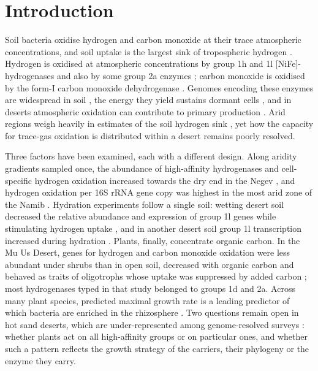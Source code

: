 \documentclass[11pt]{article}
\begin{document}
\section*{Introduction}
Soil bacteria oxidise hydrogen and carbon monoxide at their trace atmospheric concentrations, and
soil uptake is the largest sink of tropospheric hydrogen \citep{ehhalt2009h2cycle}. Hydrogen is
oxidised at atmospheric concentrations by group 1h and 1l [NiFe]-hydrogenases
\citep{greening2016genomic,ortiz2021antarctic} and also by some group 2a enzymes
\citep{islam2020group2a,grinter2023structural}; carbon monoxide is oxidised by the form-I carbon
monoxide dehydrogenase \citep{king2007coox,cordero2019atmospheric}. Genomes encoding these enzymes are
widespread in soil \citep{bay2021trace}, the energy they yield sustains dormant cells
\citep{greening2015persistence,cordero2019atmospheric}, and in deserts atmospheric oxidation can
contribute to primary production \citep{ji2017atmospheric,ray2022atmospheric}. Arid regions weigh
heavily in estimates of the soil hydrogen sink \citep{reji2025h2sink}, yet how the capacity for
trace-gas oxidation is distributed within a desert remains poorly resolved.

Three factors have been examined, each with a different design. Along aridity gradients sampled once,
the abundance of high-affinity hydrogenases and cell-specific hydrogen oxidation increased towards the
dry end in the Negev \citep{bay2021aridity}, and hydrogen oxidation per 16S rRNA gene copy was highest in
the most arid zone of the Namib \citep{tribbia2026namib}. Hydration experiments follow a single soil:
wetting desert soil decreased the relative abundance and expression of group 1l genes while stimulating
hydrogen uptake \citep{jordaan2020gobi}, and in another desert soil group 1l transcription increased
during hydration \citep{imminger2024resuscitation}. Plants, finally, concentrate organic carbon. In the
Mu Us Desert, genes for hydrogen and carbon monoxide oxidation were less abundant under shrubs than in
open soil, decreased with organic carbon and behaved as traits of oligotrophs whose uptake was suppressed
by added carbon \citep{li2023fertile}; most hydrogenases typed in that study belonged to groups 1d and
2a. Across many plant species, predicted maximal growth rate is a leading predictor of which bacteria
are enriched in the rhizosphere \citep{lopez2023rhizosphere}. Two questions remain open in hot sand
deserts, which are under-represented among genome-resolved surveys
\citep{ortiz2021antarctic,ray2022atmospheric,ray2023mmbr,hutchinson2025antarctic}: whether plants act on
all high-affinity groups or on particular ones, and whether such a pattern reflects the growth strategy
of the carriers, their phylogeny or the enzyme they carry.
\end{document}
